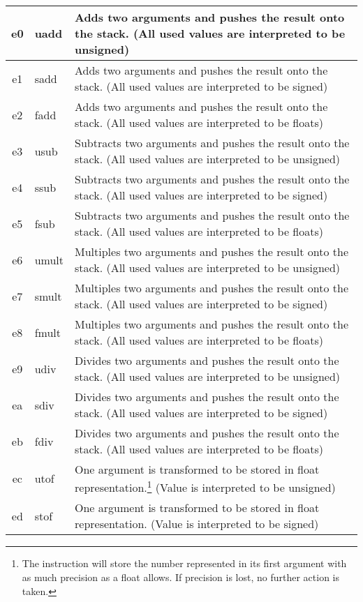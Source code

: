 \documentclass[10pt,a4paper]{article}
\makeatletter
\newcommand\footnoteref[1]{\protected@xdef\@thefnmark{\ref{#1}}\@footnotemark}
\makeatother
\begin{document}
\begin{longtable}[c]{c|l|p{9cm}}
		\hline	
		\hline	
		\hex e0 & uadd & Adds two arguments and pushes the result onto the stack. (All used values are interpreted to be unsigned) \\
		\hline		
		\hex e1 & sadd & Adds two arguments and pushes the result onto the stack. (All used values are interpreted to be signed) \\
		\hline		
		\hex e2 & fadd & Adds two arguments and pushes the result onto the stack. (All used values are interpreted to be floats) \\
		\hline		
		\hex e3 & usub & Subtracts two arguments and pushes the result onto the stack. (All used values are interpreted to be unsigned) \\
		\hline		
		\hex e4 & ssub & Subtracts two arguments and pushes the result onto the stack. (All used values are interpreted to be signed) \\		
		\hline
		\hex e5 & fsub & Subtracts two arguments and pushes the result onto the stack. (All used values are interpreted to be floats) \\		
		\hline
		\hex e6 & umult & Multiples two arguments and pushes the result onto the stack. (All used values are interpreted to be unsigned) \\	
		\hline
		\hex e7 & smult & Multiples two arguments and pushes the result onto the stack. (All used values are interpreted to be signed) \\	
		\hline
		\hex e8 & fmult & Multiples two arguments and pushes the result onto the stack. (All used values are interpreted to be floats) \\
		\hline
		\hex e9 & udiv & Divides two arguments and pushes the result onto the stack. (All used values are interpreted to be unsigned) \\	
		\hline
		\hex ea & sdiv & Divides two arguments and pushes the result onto the stack. (All used values are interpreted to be signed) \\	
		\hline
		\hex eb & fdiv & Divides two arguments and pushes the result onto the stack. (All used values are interpreted to be floats) \\
		\hline
		\hex ec & utof & One argument is transformed to be stored in float representation.\footnote{\label{tof_footnote} The instruction will store the number represented in its first argument with as much precision as a float allows. If precision is lost, no further action is taken.} (Value is interpreted to be unsigned)\\
		\hline
		\hex ed & stof & One argument is transformed to be stored in float representation.\footnoteref{tof_footnote} (Value is interpreted to be signed)\\

\end{longtable}
\end{document}
